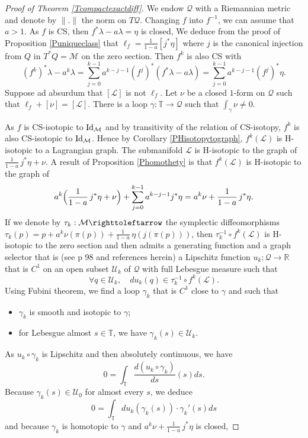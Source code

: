 \documentclass[JEP,XML,SOM,Unicode,published]{cedram}
\theoremstyle{definition}
\def\R{\mathbb{R}}
\def\T{\mathbb{T}}
\def\cL{{\mathcal L}}
\def\cM{{\mathcal M}}
\def\cQ{{\mathcal Q}}
\def\cU{{\mathcal U}}
\begin{document}
\begin{proof}[Proof of Theorem \ref{Tcompactexactdiff}]
We endow $\cQ$ with a Riemannian metric and denote by $\|.\|$ the norm on $T\cQ$. Changing $f$ into $f^{-1}$, we can assume that $a>1$. As $f$ is CS, then $f^*\lambda-a\lambda=\eta$ is closed, We deduce from the proof of Proposition \ref{Puniqueclass} that $\ell_f=\frac{1}{1-a}[j^*\eta]$ where $j$ is the canonical injection from $Q$ in $T^*Q=\cM$ on the zero section.
Then $f^k$ is also CS with
\[
(f^k)^*\lambda-a^k\lambda=\sum_{j=0}^{k-1}a^{k-j-1}(f^j)^*(f^*\lambda-a\lambda)=\sum_{j=0}^{k-1}a^{k-j-1}(f^j)^*\eta.
\]
Suppose ad absurdum that $[\cL]$ is not $\ell_f$. Let $\nu$ be a closed $1$-form on $\cQ$ such that $\ell_f+[\nu]=[\cL]$. There is a loop $\gamma:\T\to\cQ$ such that $\int_\gamma \nu\not=0$.

As $f$ is CS-isotopic to ${\rm Id}_\cM$ and by transitivity of the relation of CS-isotopy, $f^k$ is also CS-isotopic to ${\rm Id}_\cM$. Hence by Corollary \ref{PHisotopytograph}, $f^k(\cL)$ is H-isotopic to a Lagrangian graph. The submanifold $\cL$ is H-isotopic to the graph of
$\frac{1}{1-a}\,j^*\eta+\nu$. A result of Proposition \ref{Phomothety} is that $f^k(\cL)$ is H-isotopic to the graph of
\[
a^k\Bigl( \frac{1}{1-a}\,j^*\eta+\nu\Bigr)+\sum_{j=0}^{k-1}a^{k-j-1}j^*\eta=a^k\nu+\frac{1}{1-a}\,j^*\eta.
\]
If we denote by $\tau_k:\cM\righttoleftarrow$ the symplectic diffeomorphisms $\tau_k(p)=p+ a^k\nu(\pi(p))+\frac{1}{1-a}\,\eta(j(\pi(p)))$, then $\tau_{k}^{-1}\circ f^k(\cL)$ is H-isotopic to the zero section and then admits a generating function and a graph selector that is (see \eg \cite{Sib2004} p 98 and references herein) a Lipschitz function $u_k:\cQ\to \R$ that is $C^1$ on an open subset $\cU_k$ of $\cQ$ with full Lebesgue measure such that
\[
\forall q\in\cU_k,\quad du_k(q)\in \tau_{k}^{-1}\circ f^k(\cL).
\]
Using Fubini theorem, we find a loop $\gamma_k$ that is $C^1$ close to $\gamma$ and such that
\begin{itemize}
\item $\gamma_k$ is smooth and isotopic to $\gamma$;
\item for Lebesgue almost $s\in\T$, we have $\gamma_k(s)\in\cU_k$.
\end{itemize}
As $u_k\circ \gamma_k $ is Lipschitz and then absolutely continuous, we have
\[
0=\int_\T \frac{d(u_k\circ \gamma_k)}{ds}(s)ds.
\]
Because $\gamma_k(s)\in\cU_0$ for almost every $s$, we deduce
\[
0=\int_\T du_k(\gamma_k(s))\cdot \gamma_k'(s)ds
\]
and because $\gamma_k$ is homotopic to $\gamma$ and $a^k\nu+\frac{1}{1-a}\,j^*\eta$ is closed,

\end{proof}
\end{document}
